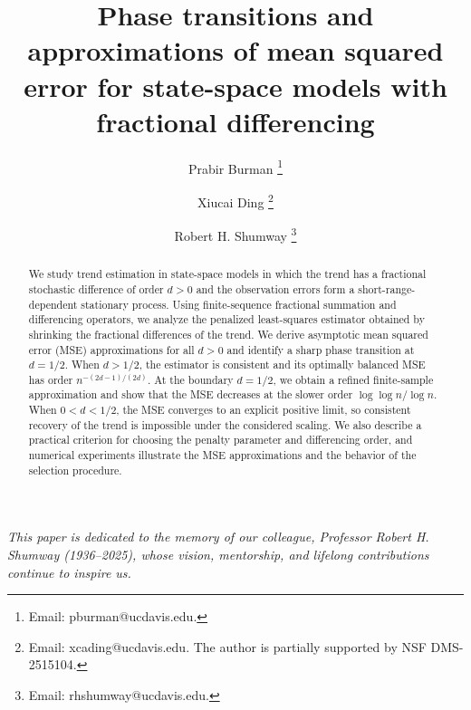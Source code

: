 \documentclass[11pt]{article}
\date{}
\numberwithin{equation}{section}
\numberwithin{figure}{section}
\begin{document}
\title{\bf Phase transitions and approximations of mean squared error for state-space models with fractional differencing} 


\author[1]{Prabir Burman \thanks{Email: pburman@ucdavis.edu.}}
\author[1]{Xiucai Ding \thanks{Email: xcading@ucdavis.edu.  The author is partially supported by NSF DMS-2515104.}}
\author[1]{
Robert H. Shumway \thanks{Email: rhshumway@ucdavis.edu.}}




\maketitle
\vspace{-30pt}
\begin{center}
      \textit{This paper is dedicated to the memory of our colleague, Professor Robert H. Shumway (1936–2025), whose vision, mentorship, and lifelong contributions continue to inspire us.}
\end{center}

\vspace{5pt}
\begin{abstract}
We study trend estimation in state-space models in which the trend has a fractional stochastic difference of order $d>0$ and the observation errors form a short-range-dependent stationary process. Using finite-sequence fractional summation and differencing operators, we analyze the penalized least-squares estimator obtained by shrinking the fractional differences of the trend. We derive asymptotic mean squared error (MSE) approximations for all $d>0$ and identify a sharp phase transition at $d=1/2$. When $d>1/2$, the estimator is consistent and its optimally balanced MSE has order $n^{-(2d-1)/(2d)}$. At the boundary $d=1/2$, we obtain a refined finite-sample approximation and show that the MSE decreases at the slower order $\log\log n/\log n$. When $0<d<1/2$, the MSE converges to an explicit positive limit, so consistent recovery of the trend is impossible under the considered scaling. We also describe a practical criterion for choosing the penalty parameter and differencing order, and numerical experiments illustrate the MSE approximations and the behavior of the selection procedure.
\end{abstract}
\end{document}
